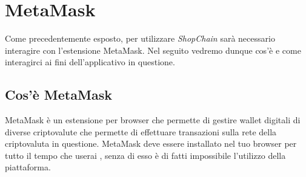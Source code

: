 \section{MetaMask}\label{section:MetaMask}
Come precedentemente esposto, per utilizzare \textit{ShopChain} sarà necessario interagire con l'estensione MetaMask. Nel seguito vedremo dunque cos'è e come interagirci ai fini dell'applicativo in questione.
\subsection{Cos'è MetaMask}
MetaMask è un estensione per browser che permette di gestire wallet digitali di diverse criptovalute\glo{} che permette di effettuare transazioni sulla rete della criptovaluta in questione.
MetaMask deve essere installato nel tuo browser per tutto il tempo che userai \projectName{}, senza di esso è di fatti impossibile l'utilizzo della piattaforma.
